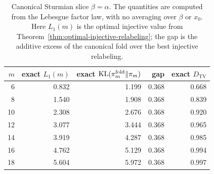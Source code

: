 \begin{table}[t]
\centering
\small
\begin{tabular}{rrrrr}
\toprule
\(m\) & exact \(L_1(m)\) & exact \(\operatorname{KL}(\pi_m^{\mathrm{fold}}\|\pi_m)\) & gap & exact \(D_{\mathrm{TV}}\) \\
\midrule
6  & 0.832 & 1.199 & 0.368 & 0.668 \\
8  & 1.540 & 1.908 & 0.368 & 0.839 \\
10 & 2.308 & 2.676 & 0.368 & 0.920 \\
12 & 3.077 & 3.444 & 0.368 & 0.965 \\
14 & 3.919 & 4.287 & 0.368 & 0.985 \\
16 & 4.762 & 5.129 & 0.368 & 0.994 \\
18 & 5.604 & 5.972 & 0.368 & 0.997 \\
\bottomrule
\end{tabular}
\caption{Canonical Sturmian slice \(\beta=\alpha\).  The quantities are
computed from the Lebesgue factor law, with no averaging over \(\beta\) or
\(x_0\).  Here \(L_1(m)\) is the optimal injective value from
Theorem~\ref{thm:optimal-injective-relabeling}; the gap is the additive excess
of the canonical fold over the best injective relabeling.}
\label{tab:canonical-injective-floor-exact}
\end{table}
